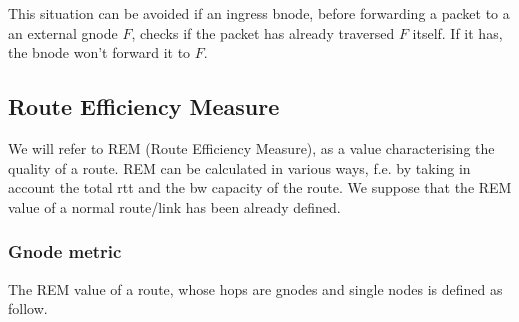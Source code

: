 \documentclass[a4paper]{article}
\begin{document}
This situation can be avoided if an ingress bnode, before forwarding a packet to a an
external gnode $F$, checks if the packet has already traversed $F$ itself. If
it has, the bnode won't forward it to $F$.

\subsection{Route Efficiency Measure}
We will refer to REM (Route Efficiency Measure), as a value characterising the
quality of a route. REM can be calculated in various ways, f.e. by taking in
account the total rtt and the bw capacity of the route. We suppose that
the REM value of a normal route/link has been already defined. 

\subsubsection{Gnode metric}
The REM value of a route, whose hops are gnodes and single nodes is defined as
follow.
\end{document}
